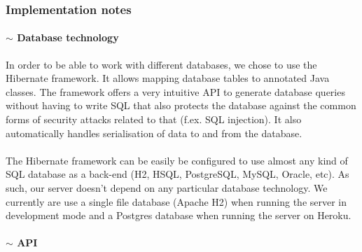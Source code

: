 \documentclass[12p, a4paper, onecolumn]{report}
\begin{document}
\subsubsection{Implementation notes}

\paragraph{$\sim$ Database technology}

In order to be able to work with different databases, we chose to use the Hibernate framework. It allows mapping database tables to annotated Java classes. The framework offers a very intuitive API to generate database queries without having to write SQL that also protects the database against the common forms of security attacks related to that (f.ex. SQL injection). It also automatically handles serialisation of data to and from the database. \\ \\
The Hibernate framework can be easily be configured to use almost any kind of SQL database as a back-end (H2, HSQL, PostgreSQL, MySQL, Oracle, etc).  As such, our server doesn’t depend on any particular database technology. We currently are use a single file database (Apache H2) when running the server in development mode and a Postgres database when running the server on Heroku. 

\paragraph{$\sim$ API}
\end{document}
